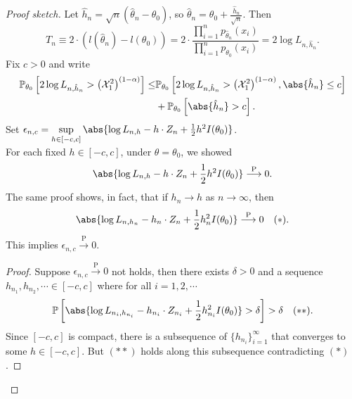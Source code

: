 \documentclass[a4paper]{article}
\begin{document}
\begin{itemize}[leftmargin=*]
	\begin{proof}[Proof sketch] Let $\hat{h}_n = \sqrt{n} (\hat{\theta}_n - \theta_0)$, so $\hat{\theta}_n = \theta_0 + \frac{\hat{h}_n}{\sqrt{n}}$.
		Then
		\begin{equation*}
			T_n \equiv 2 \cdot  \left(l(\hat{\theta}_n) - l(\theta_0)\right) = 2 \cdot \frac{\prod\limits_{i=1}^n p_{\hat{\theta}_n}(x_i)}{\prod\limits_{i=1}^n p_{\theta_0}(x_i)} = 2 \log L_{n,\hat{h}_n}.
		\end{equation*}
		Fix $c > 0$ and write
		\begin{equation*}
			\begin{aligned}
				\mathbb{P}_{\theta_0} \left[2 \log L_{n,\hat{h}_n} > \left(\mathcal{X}_1^2\right)^{(1-\alpha)} \right] \leq &\mathbb{P}_{\theta_0} \left[2 \log L_{n,\hat{h}_n} > \left(\mathcal{X}_1^2\right)^{(1-\alpha)}, \abs{\hat{h}_n} \leq c \right] \\
				&+ \mathbb{P}_{\theta_0} \left[\abs{\hat{h}_n} > c\right].	
			\end{aligned}
		\end{equation*}
		Set $\epsilon_{n,c} = \sup\limits_{h \in [-c,c]}\abs{\log L_{n,h} - h \cdot Z_n + \frac{1}{2} h^2 I(\theta_0)}$. \\
		For each fixed $h \in [-c,c]$, under $\theta = \theta_0$, we showed
		\begin{equation*}
			\abs{\log L_{n,h} - h \cdot Z_n + \frac{1}{2} h^2 I(\theta_0)} \stackrel{\text{P}}{\longrightarrow} 0.
		\end{equation*}
		The same proof shows, in fact, that if $h_n \to h$ as $n \to \infty$, then
		\begin{equation*}
			\abs{\log L_{n,h_n} - h_n \cdot Z_n + \frac{1}{2} h_n^2 I(\theta_0)} \stackrel{\text{P}}{\longrightarrow} 0 \quad (\ast).
		\end{equation*}
		This implies $\epsilon_{n,c} \stackrel{\text{P}}{\longrightarrow} 0.$
		\begin{proof}
			Suppose $\epsilon_{n,c} \stackrel{\text{P}}{\longrightarrow} 0$ not holds, then there exists $\delta > 0$ and a sequence $h_{n_1},h_{n_2},\cdots \in [-c,c]$ where for all $i = 1,2,\cdots$
			\begin{equation*}
				\mathbb{P} \left[\abs{\log L_{n_i,h_{n_i}} - h_{n_i} \cdot Z_{n_i} + \frac{1}{2} h_{n_i}^2 I(\theta_0)} > \delta \right] > \delta \quad (\ast\ast).
			\end{equation*}
			Since $[-c,c]$ is compact, there is a subsequence of $\{h_{n_i}\}_{i=1}^\infty$ that converges to some $h \in [-c,c]. $ But $(\ast\ast)$ holds along this subsequence contradicting $(\ast)$.

\end{proof}
\end{proof}
\end{itemize}
\end{document}
